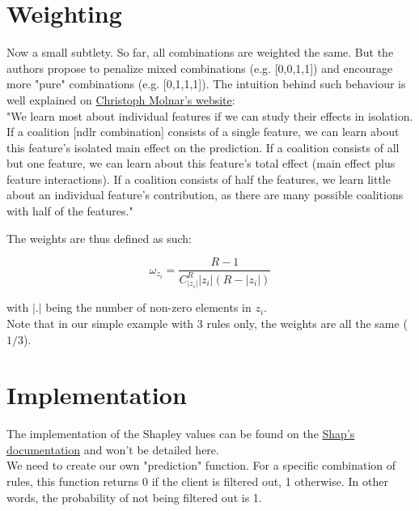 \section{Weighting}

\label{sec:weighting}

Now a small subtlety. So far, all combinations are weighted the same. But the authors propose to penalize mixed combinations (e.g. [0,0,1,1]) and encourage more "pure" combinations (e.g. [0,1,1,1]). The intuition behind such behaviour is well explained on \href{https://christophm.github.io/interpretable-ml-book/shapley.html}{Christoph Molnar’s website}: \\

"We learn most about individual features if we can study their effects in isolation. If a coalition [ndlr combination] consists of a single feature, we can learn about this feature’s isolated main effect on the prediction. If a coalition consists of all but one feature, we can learn about this feature’s total effect (main effect plus feature interactions). If a coalition consists of half the features, we learn little about an individual feature’s contribution, as there are many possible coalitions with half of the features."

The weights are thus defined as such:

$$\omega_{z_i} = \frac{R-1}{C_{|z_i|}^R |z_i|(R-|z_i|)}$$

with $|.|$ being the number of non-zero elements in $z_i$. \\

Note that in our simple example with 3 rules only, the weights are all the same ($1/3$).

\section{Implementation}

\label{sec:implementation}

The implementation of the Shapley values can be found on the \href{https://shap.readthedocs.io/en/latest/example_notebooks/tabular_examples/model_agnostic/Simple%20Kernel%20SHAP.html}{Shap's documentation} and won't be detailed here. \\

We need to create our own "prediction" function. For a specific combination of rules, this function returns $0$ if the client is filtered out, 1 otherwise. In other words, the probability of not being filtered out is 1. \\

